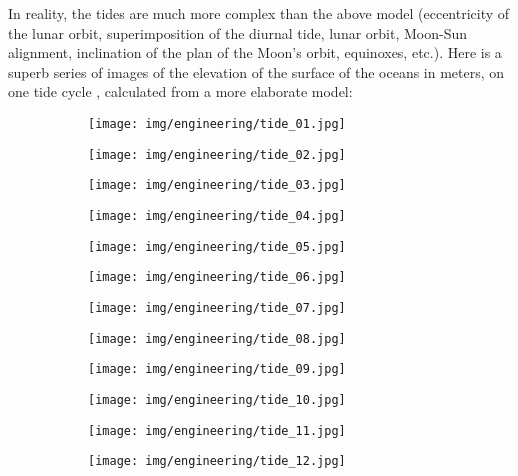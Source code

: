 	In reality, the tides are much more complex than the above model (eccentricity of the lunar orbit, superimposition of the diurnal tide, lunar orbit, Moon-Sun alignment, inclination of the plan of the Moon's orbit, equinoxes, etc.). Here is a superb series of images of the elevation of the surface of the oceans in meters, on one tide cycle , calculated from a more elaborate model:
	\begin{figure}[H]
		\centering
		\begin{subfigure}{.4\textwidth}
		  \centering
		  \texttt{[image: img/engineering/tide\_01.jpg]}
		\end{subfigure}
		\begin{subfigure}{.4\textwidth}
		  \centering
		  \texttt{[image: img/engineering/tide\_02.jpg]}
		\end{subfigure}
		\begin{subfigure}{.4\textwidth}
		  \centering
		  \texttt{[image: img/engineering/tide\_03.jpg]}
		\end{subfigure}
		\begin{subfigure}{.4\textwidth}
		  \centering
		  \texttt{[image: img/engineering/tide\_04.jpg]}
		\end{subfigure}
		\begin{subfigure}{.4\textwidth}
		  \centering
		  \texttt{[image: img/engineering/tide\_05.jpg]}
		\end{subfigure}
		\begin{subfigure}{.4\textwidth}
		  \centering
		  \texttt{[image: img/engineering/tide\_06.jpg]}
		\end{subfigure}
		\begin{subfigure}{.4\textwidth}
		  \centering
		  \texttt{[image: img/engineering/tide\_07.jpg]}
		\end{subfigure}
		\begin{subfigure}{.4\textwidth}
		  \centering
		  \texttt{[image: img/engineering/tide\_08.jpg]}
		\end{subfigure}
		\begin{subfigure}{.4\textwidth}
		  \centering
		  \texttt{[image: img/engineering/tide\_09.jpg]}
		\end{subfigure}
		\begin{subfigure}{.4\textwidth}
		  \centering
		  \texttt{[image: img/engineering/tide\_10.jpg]}
		\end{subfigure}
		\begin{subfigure}{.4\textwidth}
		  \centering
		  \texttt{[image: img/engineering/tide\_11.jpg]}
		\end{subfigure}
		\begin{subfigure}{.4\textwidth}
		  \centering
		  \texttt{[image: img/engineering/tide\_12.jpg]}
		\end{subfigure}
	\end{figure}
	
